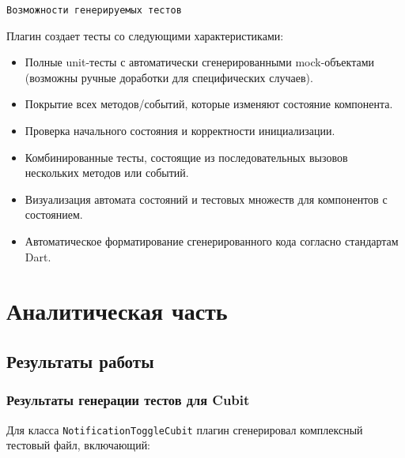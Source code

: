 \documentclass[14pt, russian]{scrartcl}
\begin{document}
\texttt{Возможности генерируемых тестов}

Плагин создает тесты со следующими характеристиками:

\begin{itemize}
    \item Полные unit-тесты с автоматически сгенерированными mock-объектами (возможны ручные доработки для специфических случаев).
    \item Покрытие всех методов/событий, которые изменяют состояние компонента.
    \item Проверка начального состояния и корректности инициализации.
    \item Комбинированные тесты, состоящие из последовательных вызовов нескольких методов или событий.
    \item Визуализация автомата состояний и тестовых множеств для компонентов с состоянием.
    \item Автоматическое форматирование сгенерированного кода согласно стандартам Dart.
\end{itemize}

\section{Аналитическая часть}

\subsection{Результаты работы}


\subsubsection{Результаты генерации тестов для Cubit}

Для класса \texttt{NotificationToggleCubit} плагин сгенерировал комплексный тестовый файл, включающий:
\end{document}
